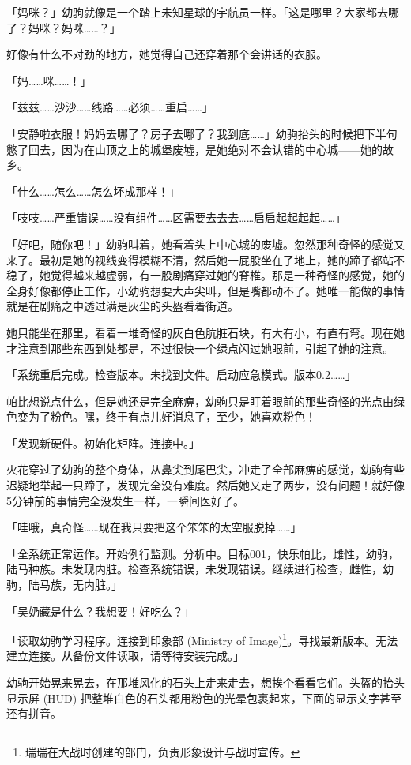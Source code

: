 「妈咪？」幼驹就像是一个踏上未知星球的宇航员一样。「这是哪里？大家都去哪了？妈咪？妈咪……？」

好像有什么不对劲的地方，她觉得自己还穿着那个会讲话的衣服。

「妈……咪……！」

「{\mt 兹兹……沙沙……线路……必须……重启……}」

「安静啦衣服！妈妈去哪了？房子去哪了？我到底……」幼驹抬头的时候把下半句憋了回去，因为在山顶之上的城堡废墟，是她绝对不会认错的中心城——她的故乡。

「什么……怎么……怎么坏成那样！」

「{\mt 吱吱……严重错误……没有组件……区需要去去去……启启起起起起……}」

「好吧，随你吧！」幼驹叫着，她看着头上中心城的废墟。忽然那种奇怪的感觉又来了。最初是她的视线变得模糊不清，然后她一屁股坐在了地上，她的蹄子都站不稳了，她觉得越来越虚弱，有一股剧痛穿过她的脊椎。那是一种奇怪的感觉，她的全身好像都停止工作，小幼驹想要大声尖叫，但是嘴都动不了。她唯一能做的事情就是在剧痛之中透过满是灰尘的头盔看着街道。

她只能坐在那里，看着一堆奇怪的灰白色肮脏石块，有大有小，有直有弯。现在她才注意到那些东西到处都是，不过很快一个绿点闪过她眼前，引起了她的注意。

「{\mt 系统重启完成。检查版本。未找到文件。启动应急模式。版本0.2……}」

帕比想说点什么，但是她还是完全麻痹，幼驹只是盯着眼前的那些奇怪的光点由绿色变为了粉色。嘿，终于有点儿好消息了，至少，她喜欢粉色！

「{\mt 发现新硬件。初始化矩阵。连接中。}」

火花穿过了幼驹的整个身体，从鼻尖到尾巴尖，冲走了全部麻痹的感觉，幼驹有些迟疑地举起一只蹄子，发现完全没有难度。然后她又走了两步，没有问题！就好像5分钟前的事情完全没发生一样，一瞬间医好了。

「哇哦，真奇怪……现在我只要把这个笨笨的太空服脱掉……」

「{\mt 全系统正常运作。开始例行监测。分析中。目标001，快乐帕比，雌性，幼驹，陆马种族。未发现内脏。检查系统错误，未发现错误。继续进行检查，雌性，幼驹，陆马族，无内脏。}」

「吴奶藏是什么？我想要！好吃么？」

「{\mt 读取幼驹学习程序。连接到印象部 (Ministry of Image)\footnote{瑞瑞在大战时创建的部门，负责形象设计与战时宣传。}。寻找最新版本。无法建立连接。从备份文件读取，请等待安装完成。}」

幼驹开始晃来晃去，在那堆风化的石头上走来走去，想挨个看看它们。头盔的抬头显示屏 (HUD) 把整堆白色的石头都用粉色的光晕包裹起来，下面的显示文字甚至还有拼音。

